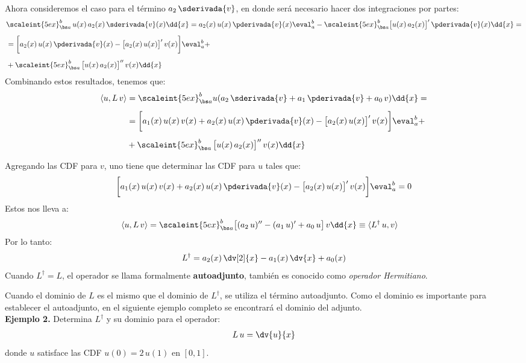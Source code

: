 Ahora consideremos el caso para el término $a_{2} \, \sderivada{v}$, en donde será necesario hacer dos integraciones por partes:
\begin{align}
\begin{aligned}[b]
&\scaleint{5ex}_{\bs a}^{b} \, u(x) \, a_{2} (x) \, \sderivada{v}(x) \dd{x} = a_{2}(x) \, u(x) \, \pderivada{v}(x) \eval_{a}^{b} - \scaleint{5ex}_{\bs a}^{b} \big[ u(x) \, a_{2} (x) \big]^{\prime} \, \pderivada{v}(x) \dd{x} = \\[0.5em]
&= \bigg[ a_{2}(x) \, u(x) \, \pderivada{v}(x) - \big[ a_{2}(x) \, u(x) \big]^{\prime} \, v(x) \bigg] \eval_{a}^{b} + \\[0.5em]
&+ \scaleint{5ex}_{\bs a}^{b} \, \big[ u(x) \, a_{2} (x) \big]^{\prime \prime} \, v(x) \dd{x}
\end{aligned}
\label{eq:ecuacion_04_18}
\end{align}
Combinando estos resultados, tenemos que:
\begin{align}
\begin{aligned}[b]
\langle u , L \, v \rangle &= \scaleint{5ex}_{\bs a}^{b} u (a_{2} \, \sderivada{v} + a_{1} \, \pderivada{v} + a_{0} \, v) \dd{x} = \\[0.5em]
&= \bigg[ a_{1} (x) \, u (x) \, v (x) + a_{2} (x) \, u(x) \, \pderivada{v}(x) - \big[ a_{2} (x) \, u (x) \big]^{\prime} \, v (x) \bigg] \eval_{a}^{b} + \\[0.5em]
&+ \scaleint{5ex}_{\bs a}^{b} \, \big[ u (x) \, a_{2} (x) \big]^{\prime \prime} \, v (x) \dd{x}
\end{aligned}
\label{eq:ecuacion_04_19}
\end{align}

Agregando las CDF para $v$, uno tiene que determinar las CDF para $u$ tales que:
\begin{align*}
\bigg[ a_{1} (x) \, u(x) \, v(x) + a_{2} (x) \, u(x) \, \pderivada{v} (x) - \big[ a_{2} (x) \, u(x) \big]^{\prime} \, v (x) \bigg] \eval_{a}^{b} = 0
\end{align*}
Estos nos lleva a:
\begin{align*}
\langle u , L \, v \rangle &= \scaleint{5ex}_{\bs a}^{b}  \big[ (a_{2} \, u)^{\prime \prime} - (a_{1} \, u)^{\prime} + a_{0} \, u \big] \, v \dd{x} \equiv \langle L^{\dagger} \, u, v \rangle 
\end{align*}
Por lo tanto:
\begin{align}
L^{\dagger} = a_{2} (x) \, \dv[2]{x} - a_{1} (x) \, \dv{x}  + a_{0}(x)
\label{eq:ecuacion_04_20}
\end{align}
Cuando $L^{\dagger} = L$, el operador se llama formalmente \textbf{autoadjunto}, también es conocido como \emph{operador Hermitiano}.
\par
Cuando el dominio de $L$ es el mismo que el dominio de $L^{\dagger}$, se utiliza el término autoadjunto. Como el dominio es importante para establecer el autoadjunto, en el siguiente ejemplo completo se encontrará el dominio del adjunto.
\\[0.5em]
\noindent
\textbf{Ejemplo 2.} Determina $L^{\dagger}$ y su dominio para el operador:
\begin{align*}
L \, u = \dv{u}{x}
\end{align*}
donde $u$ satisface las CDF $u(0) = 2 \, u(1)$ en $[0, 1]$.

